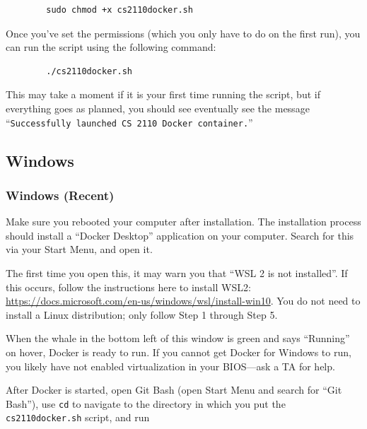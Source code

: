 \begin{center}
    \begin{verbatim}
        sudo chmod +x cs2110docker.sh
    \end{verbatim}
\end{center}

Once you’ve set the permissions (which you only have to do on the first run), you can run the script using the following command:

\begin{center}
    \begin{verbatim}
        ./cs2110docker.sh
    \end{verbatim}
\end{center}

This may take a moment if it is your first time running the script, but if everything goes as planned, you should see eventually see the message ``\texttt{Successfully launched CS 2110 Docker container.}''

\subsection{Windows}

\subsubsection{Windows (Recent)} \label{windows-new-starting}

Make sure you rebooted your computer after installation. The installation process should install a ``Docker Desktop'' application on your computer. Search for this via your Start Menu, and open it.

The first time you open this, it may warn you that ``WSL 2 is not installed''. If this occurs, follow the instructions here to install WSL2: \href{https://docs.microsoft.com/en-us/windows/wsl/install-win10#step-1---enable-the-windows-subsystem-for-linux}{https://docs.microsoft.com/en-us/windows/wsl/install-win10}. You do not need to install a Linux distribution; only follow Step 1 through Step 5.

When the whale in the bottom left of this window is green and says ``Running'' on hover, Docker is ready to run. If you cannot get Docker for Windows to run, you likely have not enabled virtualization in your BIOS---ask a TA for help.

After Docker is started, open Git Bash (open Start Menu and search for ``Git Bash''), use \texttt{cd} to navigate to the directory in which you put the \texttt{cs2110docker.sh} script, and run

